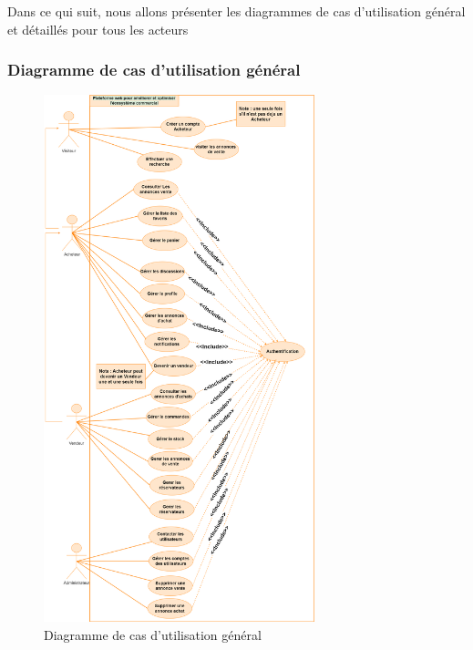 \documentclass[edit,12pt,a4paper,ChapStyle,oneside,doubleinterligne]{report}
\begin{document}
Dans ce qui suit, nous allons présenter les diagrammes de cas d'utilisation général et détaillés pour tous les acteurs
\clearpage
\subsubsection{Diagramme de cas d'utilisation général}
\begin{figure}[h!]\label{fig:Diagramme de cas d'utilisation}
\centering
\includegraphics[width=0.7\textwidth]{images/diagramme de cas g 1.png}
\caption{Diagramme de cas d'utilisation général}
\end{figure}
\newpage
\end{document}

